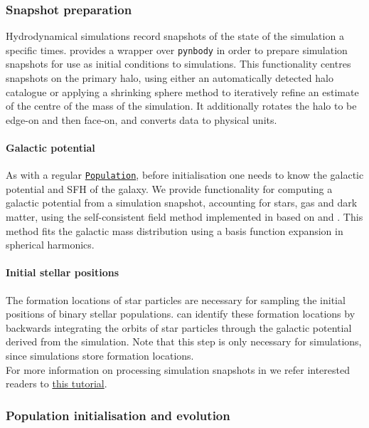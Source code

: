 \documentclass[twocolumn, twocolappendix, oneside]{aastex631}
\newcommand{\codeLink}[2]{{\href{https://cogsworth.readthedocs.io/en/latest/api/cogsworth.#2.#1.html}{\color{codecolour} \texttt{#1}}}}
\newcommand{\tutorialLink}[2]{\href{#1}{{\color{codecolour}#2}}}
\begin{document}
\subsubsection{Snapshot preparation}\label{sec:prep_snapshots}

Hydrodynamical simulations record snapshots of the state of the simulation a specific times. \cogsworth provides a wrapper over \texttt{pynbody} \citep{pynbody} in order to prepare simulation snapshots for use as initial conditions to simulations. This functionality centres snapshots on the primary halo, using either an automatically detected halo catalogue or applying a shrinking sphere method to iteratively refine an estimate of the centre of the mass of the simulation. It additionally rotates the halo to be edge-on and then face-on, and converts data to physical units. 

\paragraph{Galactic potential} As with a regular \codeLink{Population}{pop}, before initialisation one needs to know the galactic potential and SFH of the galaxy. We provide functionality for computing a galactic potential from a simulation snapshot, accounting for stars, gas and dark matter, using the self-consistent field method implemented in \gala based on \citet{Hernquist+1992:1992ApJ...386..375H} and \citet{Lowing+2011:2011MNRAS.416.2697L}. This method fits the galactic mass distribution using a basis function expansion in spherical harmonics.

\paragraph{Initial stellar positions} The formation locations of star particles are necessary for sampling the initial positions of binary stellar populations. \cogsworth can identify these formation locations by backwards integrating the orbits of star particles through the galactic potential derived from the simulation. Note that this step is only necessary for \fire simulations, since \changa simulations store formation locations.\\

\noindent For more information on processing simulation snapshots in \cogsworth we refer interested readers to \tutorialLink{https://cogsworth.readthedocs.io/en/latest/tutorials/hydro/prep.html}{this tutorial}.

\subsubsection{Population initialisation and evolution}
\end{document}

